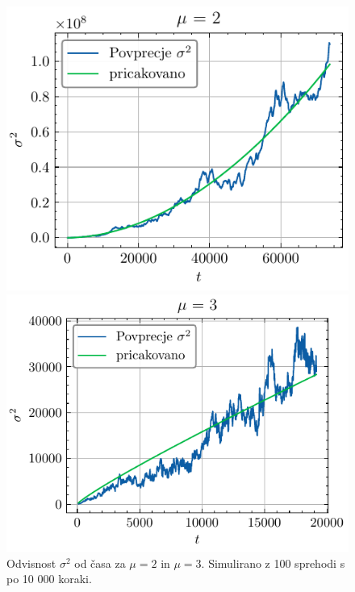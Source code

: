\documentclass[slovene,11pt,a4paper]{article}
\begin{document}
\begin{figure}[ht]
  \centering
  \begin{minipage}{0.48\textwidth}
    \centering
    \includegraphics[width=\linewidth]{graphs/mu=2.pdf}
    
  \end{minipage}%
  \hfill%
  \begin{minipage}{0.48\textwidth}
    \centering
    \includegraphics[width=\linewidth]{graphs/mu=3.pdf}
    
  \end{minipage}
  \caption{Odvisnost $\sigma^2$ od časa za $\mu=2$ in $\mu=3$. Simulirano z 100 sprehodi s po 10 000 koraki.}
  \label{fig: special}
\end{figure}
\end{document}
